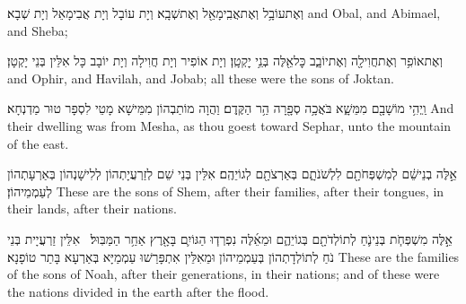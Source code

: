 {וְאֶת\maqqaf עוֹבָ֥ל וְאֶת\maqqaf אֲבִֽימָאֵ֖ל וְאֶת\maqqaf שְׁבָֽא׃}
{וְיָת עוֹבָל וְיָת אֲבִימָאֵל וְיָת שְׁבָא׃}
{and Obal, and Abimael, and Sheba;}{}

{וְאֶת\maqqaf אוֹפִ֥ר וְאֶת\maqqaf חֲוִילָ֖ה וְאֶת\maqqaf יוֹבָ֑ב כׇּל\maqqaf אֵ֖לֶּה בְּנֵ֥י יׇקְטָֽן׃}
{וְיָת אוֹפִיר וְיָת חֲוִילָה וְיָת יוֹבָב כָּל אִלֵּין בְּנֵי יָקְטָן׃}
{and Ophir, and Havilah, and Jobab; all these were the sons of Joktan.}{}

{וַֽיְהִ֥י מוֹשָׁבָ֖ם מִמֵּשָׁ֑א בֹּאֲכָ֥ה סְפָ֖רָה הַ֥ר הַקֶּֽדֶם׃}
{וַהֲוָה מוֹתַבְהוֹן מִמֵּישָׁא מָטֵי לִסְפָר טוּר מַדְנְחָא׃}
{And their dwelling was from Mesha, as thou goest toward Sephar, unto the mountain of the east.}{}

{אֵ֣לֶּה בְנֵי\maqqaf שֵׁ֔ם לְמִשְׁפְּחֹתָ֖ם לִלְשֹׁנֹתָ֑ם בְּאַרְצֹתָ֖ם לְגוֹיֵהֶֽם׃}
{אִלֵּין בְּנֵי שֵׁם לְזַרְעֲיָתְהוֹן לְלִישָׁנְהוֹן בְּאַרְעָתְהוֹן לְעַמְמֵיהוֹן׃}
{These are the sons of Shem, after their families, after their tongues, in their lands, after their nations.}{}

{אֵ֣לֶּה מִשְׁפְּחֹ֧ת בְּנֵי\maqqaf נֹ֛חַ לְתוֹלְדֹתָ֖ם בְּגוֹיֵהֶ֑ם וּמֵאֵ֜לֶּה נִפְרְד֧וּ הַגּוֹיִ֛ם בָּאָ֖רֶץ אַחַ֥ר הַמַּבּֽוּל׃ \petucha }
{אִלֵּין זַרְעֲיָית בְּנֵי נֹחַ לְתוֹלְדָתְהוֹן בְּעַמְמֵיהוֹן וּמֵאִלֵּין אִתְפָּרַשׁוּ עַמְמַיָּא בְּאַרְעָא בָּתַר טוֹפָנָא׃}
{These are the families of the sons of Noah, after their generations, in their nations; and of these were the nations divided in the earth after the flood.}{}

